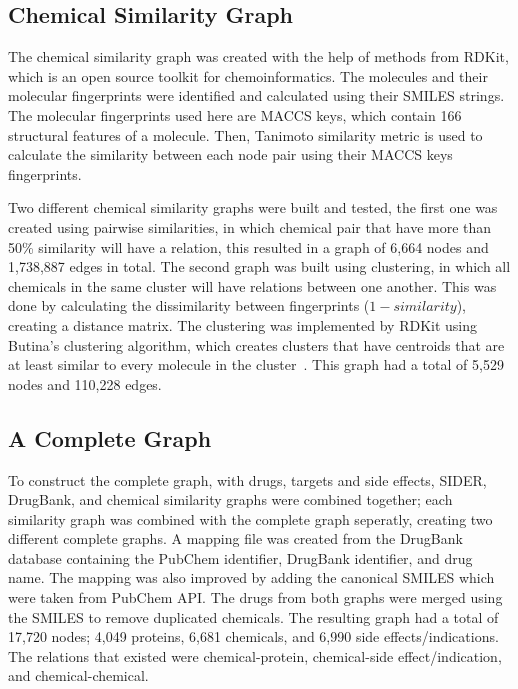 \subsection{Chemical Similarity Graph}

The chemical similarity graph was created with the help of methods from RDKit, which is an open source toolkit for chemoinformatics.
The molecules and their molecular fingerprints were identified and calculated using their \ac{SMILES} strings.
The molecular fingerprints used here are MACCS keys, which contain 166 structural features of a molecule.
Then, Tanimoto similarity metric is used to calculate the similarity between each node pair using their MACCS keys fingerprints.

Two different chemical similarity graphs were built and tested, the first one was created using pairwise similarities, in which chemical pair that have more than 50\% similarity will have a relation, this resulted in a graph of 6,664 nodes and 1,738,887 edges in total.
The second graph was built using clustering, in which all chemicals in the same cluster will have relations between one another.
This was done by calculating the dissimilarity between fingerprints ($1 - similarity$), creating a distance matrix.
The clustering was implemented by RDKit using Butina's clustering algorithm, which creates clusters that have centroids that are at least similar to every molecule in the cluster~\cite{butina_unsupervised_1999}.
This graph had a total of 5,529 nodes and 110,228 edges.

\subsection{A Complete Graph}

To construct the complete graph, with drugs, targets and side effects, \ac{SIDER}, DrugBank, and chemical similarity graphs were combined together; each similarity graph was combined with the complete graph seperatly, creating two different complete graphs.
A mapping file was created from the DrugBank database containing the PubChem identifier, DrugBank identifier, and drug name.
The mapping was also improved by adding the canonical \ac{SMILES} which were taken from PubChem API.
The drugs from both graphs were merged using the SMILES to remove duplicated chemicals.
The resulting graph had a total of 17,720 nodes; 4,049 proteins, 6,681 chemicals, and 6,990 side effects/indications.
The relations that existed were chemical-protein, chemical-side effect/indication, and chemical-chemical.

